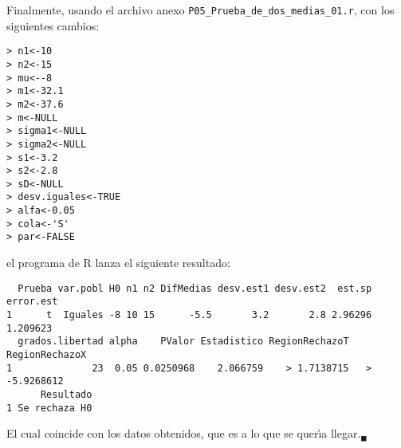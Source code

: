\begin{solucion}
 Finalmente, usando el archivo anexo
 \texttt{P05\_Prueba\_de\_dos\_medias\_01.r},
 con los siguientes cambios:
 \begin{verbatim}
> n1<-10
> n2<-15
> mu<--8
> m1<-32.1
> m2<-37.6
> m<-NULL
> sigma1<-NULL
> sigma2<-NULL
> s1<-3.2
> s2<-2.8
> sD<-NULL
> desv.iguales<-TRUE
> alfa<-0.05
> cola<-'S'
> par<-FALSE
 \end{verbatim}
 \vspace{-0.5cm}
 el programa de R lanza el siguiente resultado:
 \begin{verbatim}
  Prueba var.pobl H0 n1 n2 DifMedias desv.est1 desv.est2  est.sp error.est
1      t  Iguales -8 10 15      -5.5       3.2       2.8 2.96296  1.209623
  grados.libertad alpha    PValor Estadistico RegionRechazoT RegionRechazoX
1              23  0.05 0.0250968    2.066759    > 1.7138715   > -5.9268612
      Resultado
1 Se rechaza H0
 \end{verbatim}
 \vspace{-0.5cm}
 El cual coincide con los datos obtenidos,
 que es a lo que se quer\'{\i}a llegar.${}_{\blacksquare}$
\end{solucion}
